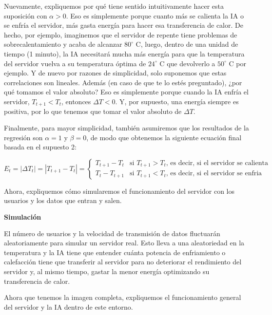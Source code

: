 \documentclass[
]{book}
\begin{document}
Nuevamente, expliquemos por qué tiene sentido intuitivamente hacer esta suposición con \(\alpha>0\). Eso es simplemente porque cuanto más se calienta la IA o se enfría el servidor, más gasta energía para hacer esa transferencia de calor. De hecho, por ejemplo, imaginemos que el servidor de repente tiene problemas de sobrecalentamiento y acaba de alcanzar \(80^{\circ}\) C, luego, dentro de una unidad de tiempo (1 minuto), la IA necesitará mucha más energía para que la temperatura del servidor vuelva a su temperatura óptima de \(24^{\circ}\) C que devolverlo a \(50^{\circ}\) C por ejemplo. Y de nuevo por razones de simplicidad, solo suponemos que estas correlaciones son lineales. Además (en caso de que te lo estés preguntado), ¿por qué tomamos el valor absoluto? Eso es simplemente porque cuando la IA enfría el servidor, \(T_{t + 1}<T_t\), entonces \(\Delta T <0\). Y, por supuesto, una energía siempre es positiva, por lo que tenemos que tomar el valor absoluto de \(\Delta T\).

Finalmente, para mayor simplicidad, también asumiremos que los resultados de la regresión son \(\alpha = 1\) y \(\beta = 0\), de modo que obtenemos la siguiente ecuación final basada en el supuesto 2:

\begin{equation*}
E_t = |\Delta T_t| = |T_{t+1} - T_t| =
\begin{cases}
T_{t+1} - T_t & \textrm{si $T_{t+1} > T_t$, es decir, si el servidor se calienta} \\
T_t - T_{t+1} & \textrm{si $T_{t+1} < T_t$, es decir, si el servidor se enfria}
\end{cases}
\end{equation*}

Ahora, expliquemos cómo simularemos el funcionamiento del servidor con los usuarios y los datos que entran y salen.

\textbf{Simulación}

El número de usuarios y la velocidad de transmisión de datos fluctuarán aleatoriamente para simular un servidor real. Esto lleva a una aleatoriedad en la temperatura y la IA tiene que entender cuánta potencia de enfriamiento o calefacción tiene que transferir al servidor para no deteriorar el rendimiento del servidor y, al mismo tiempo, gastar la menor energía optimizando su transferencia de calor.

Ahora que tenemos la imagen completa, expliquemos el funcionamiento general del servidor y la IA dentro de este entorno.
\end{document}
